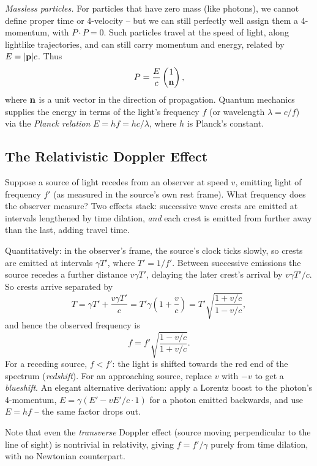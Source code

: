 \documentclass[a4paper]{scrartcl}
\begin{document}
\emph{Massless particles.} For particles that have zero mass (like photons), we cannot define proper time or 4-velocity -- but we can still perfectly well assign them a 4-momentum, with $P \cdot P = 0$. Such particles travel at the speed of light, along lightlike trajectories, and can still carry momentum and energy, related by $E = |\mathbf{p}| c$. Thus
$$
P = \frac{E}{c} \begin{pmatrix}
	1 \\ \mathbf{n}
\end{pmatrix},
$$
where $\mathbf{n}$ is a unit vector in the direction of propagation. Quantum mechanics supplies the energy in terms of the light's frequency $f$ (or wavelength $\lambda = c/f$) via the \emph{Planck relation} $E = hf = hc/\lambda$, where $h$ is Planck's constant.

\subsection{The Relativistic Doppler Effect}

Suppose a source of light recedes from an observer at speed $v$, emitting light of frequency $f'$ (as measured in the source's own rest frame). What frequency does the observer measure? Two effects stack: successive wave crests are emitted at intervals lengthened by time dilation, \emph{and} each crest is emitted from further away than the last, adding travel time.

Quantitatively: in the observer's frame, the source's clock ticks slowly, so crests are emitted at intervals $\gamma T'$, where $T' = 1/f'$. Between successive emissions the source recedes a further distance $v \gamma T'$, delaying the later crest's arrival by $v\gamma T'/c$. So crests arrive separated by
$$
T = \gamma T' + \frac{v \gamma T'}{c} = T' \gamma\left(1 + \frac{v}{c}\right) = T'\sqrt{\frac{1 + v/c}{1 - v/c}},
$$
and hence the observed frequency is
$$
f = f' \sqrt{\frac{1 - v/c}{1 + v/c}}.
$$
For a receding source, $f < f'$: the light is shifted towards the red end of the spectrum (\emph{redshift}). For an approaching source, replace $v$ with $-v$ to get a \emph{blueshift}. An elegant alternative derivation: apply a Lorentz boost to the photon's 4-momentum, $E = \gamma(E' - vE'/c \cdot 1)$ for a photon emitted backwards, and use $E = hf$ -- the same factor drops out.

Note that even the \emph{transverse} Doppler effect (source moving perpendicular to the line of sight) is nontrivial in relativity, giving $f = f'/\gamma$ purely from time dilation, with no Newtonian counterpart.
\end{document}
